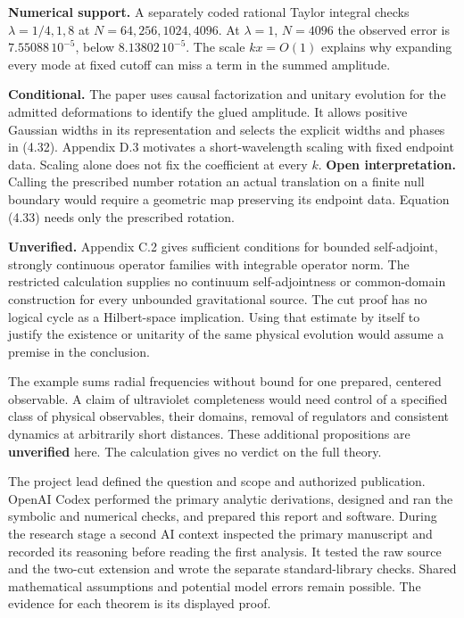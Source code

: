 \textbf{Numerical support.} A separately coded rational Taylor integral checks $\lambda=1/4,1,8$ at $N=64,256,1024,4096$. At $\lambda=1$, $N=4096$ the observed error is $7.55088\,10^{-5}$, below $8.13802\,10^{-5}$. The scale $kx=O(1)$ explains why expanding every mode at fixed cutoff can miss a term in the summed amplitude.

\newpage
{}
\textbf{Conditional.} The paper uses causal factorization and unitary evolution for the admitted deformations to identify the glued amplitude. It allows positive Gaussian widths in its representation and selects the explicit widths and phases in (4.32). Appendix D.3 motivates a short-wavelength scaling with fixed endpoint data. Scaling alone does not fix the coefficient at every $k$. \textbf{Open interpretation.} Calling the prescribed number rotation an actual translation on a finite null boundary would require a geometric map preserving its endpoint data. Equation (4.33) needs only the prescribed rotation.

\textbf{Unverified.} Appendix C.2 gives sufficient conditions for bounded self-adjoint, strongly continuous operator families with integrable operator norm. The restricted calculation supplies no continuum self-adjointness or common-domain construction for every unbounded gravitational source. The cut proof has no logical cycle as a Hilbert-space implication. Using that estimate by itself to justify the existence or unitarity of the same physical evolution would assume a premise in the conclusion.

The example sums radial frequencies without bound for one prepared, centered observable. A claim of ultraviolet completeness would need control of a specified class of physical observables, their domains, removal of regulators and consistent dynamics at arbitrarily short distances. These additional propositions are \textbf{unverified} here. The calculation gives no verdict on the full theory.

The project lead defined the question and scope and authorized publication. OpenAI Codex performed the primary analytic derivations, designed and ran the symbolic and numerical checks, and prepared this report and software. During the research stage a second AI context inspected the primary manuscript and recorded its reasoning before reading the first analysis. It tested the raw source and the two-cut extension and wrote the separate standard-library checks. Shared mathematical assumptions and potential model errors remain possible. The evidence for each theorem is its displayed proof.

